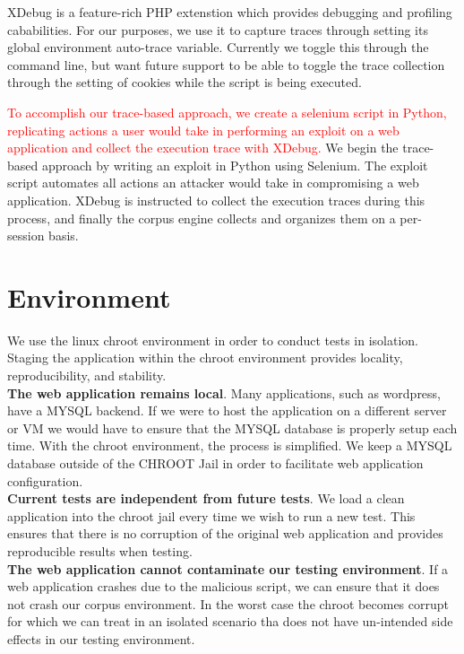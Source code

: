\documentclass[letterpaper,twocolumn,10pt]{article}
\begin{document}
XDebug is a feature-rich PHP extenstion which provides debugging and profiling cababilities.  For our purposes, we use it to capture traces through setting its global environment auto-trace variable.  Currently we toggle this through the command line, but want future support to be able to toggle the trace collection through the setting of cookies while the script is being executed.


\textcolor{red}{To accomplish our trace-based approach, we create a selenium script in Python, replicating actions a user would take in performing an exploit on a web application and collect the execution trace with XDebug.}
We begin the trace-based approach by writing an exploit in Python using Selenium. The exploit script automates all actions an attacker would take in compromising a web application. XDebug is instructed to collect the execution traces during this process, and finally the corpus engine collects and organizes them on a per-session basis.

\section{Environment}

We use the linux chroot environment in order to conduct tests in isolation.  Staging the application within the chroot environment provides locality, reproducibility, and stability.\\

{\bf The web application remains local}.  Many applications, such as wordpress, have a MYSQL backend.  If we were to host the application on a different server or VM we would have to ensure that the MYSQL database is properly setup each time.  With the chroot environment, the process is simplified. We keep a MYSQL database outside of the CHROOT Jail in order to facilitate web application configuration.  \\

{\bf Current tests are independent from future tests}.  We load a clean application into the chroot jail every time we wish to run a new test.  This ensures that there is no corruption of the original web application and provides reproducible results when testing.\\

{\bf The web application cannot contaminate our testing environment}.  If a web application crashes due to the malicious script, we can ensure that it does not crash our corpus environment.  In the worst case the chroot becomes corrupt for which we can treat in an isolated scenario tha does not have un-intended side effects in our testing environment.  \\
\end{document}
